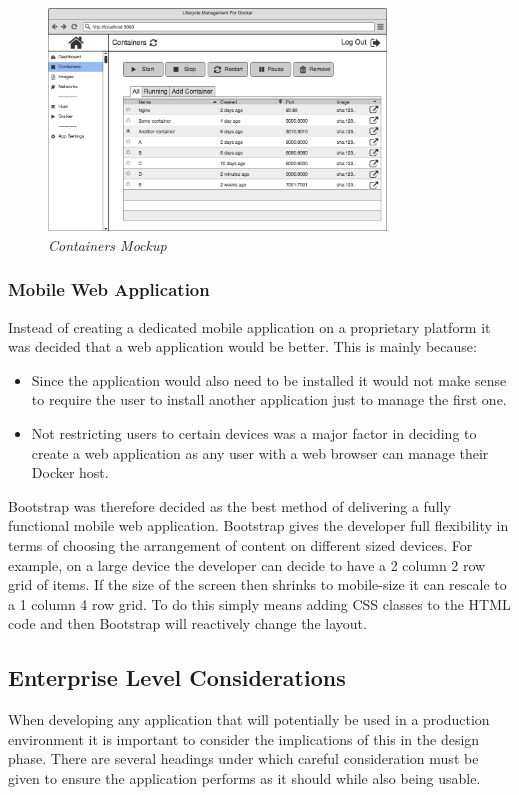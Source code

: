 \begin{figure}[!ht]
\centering
\includegraphics*[width=0.8\textwidth]{wireframes/containers}
\caption{\em Containers Mockup}
\label{fig:containers_wireframe}
\end{figure}

\subsubsection{Mobile Web Application}
Instead of creating a dedicated mobile application on a proprietary platform it was decided that a web application would be better. This is mainly because:

\begin{itemize}
	\item Since the application would also need to be installed it would not make sense to require the user to install another application just to manage the first one.
	\item Not restricting users to certain devices was a major factor in deciding to create a web application as any user with a web browser can manage their \gls{Docker host}.
\end{itemize} 

\gls{Bootstrap} was therefore decided as the best method of delivering a fully functional mobile web application. Bootstrap gives the developer full flexibility in terms of choosing the arrangement of content on different sized devices. For example, on a large device the developer can decide to have a 2 column 2 row grid of items. If the size of the screen then shrinks to mobile-size it can rescale to a 1 column 4 row grid. To do this simply means adding \gls{CSS} classes to the \gls{HTML} code and then Bootstrap will reactively change the layout.

\subsection{Enterprise Level Considerations}
When developing any application that will potentially be used in a production environment it is important to consider the implications of this in the design phase. There are several headings under which careful consideration must be given to ensure the application performs as it should while also being usable.

